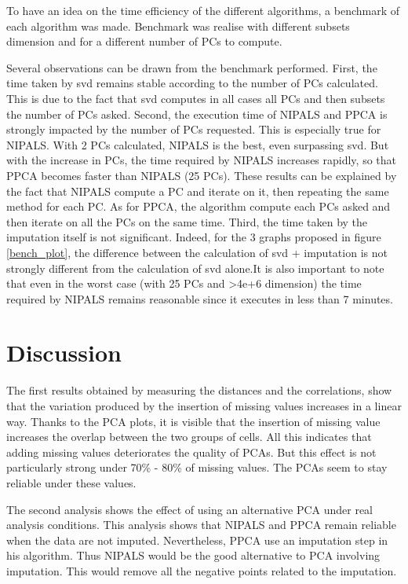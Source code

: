 \documentclass[a4paper, 11pt, twocolumn]{article}
\begin{document}
To have an idea on the time efficiency of the different algorithms, a benchmark of each algorithm was made. Benchmark was realise with different subsets dimension and for a different number of PCs to compute.

Several observations can be drawn from the benchmark performed.  First, the time taken by svd remains stable according to the number of PCs calculated. This is due to the fact that svd computes in all cases all PCs and then subsets the number of PCs asked. Second, the execution time of NIPALS and PPCA is strongly impacted by the number of PCs requested. This is especially true for NIPALS. With 2 PCs calculated, NIPALS is the best, even surpassing svd. But with the increase in PCs, the time required by NIPALS increases rapidly, so that PPCA becomes faster than NIPALS (25 PCs). These results can be explained by the fact that NIPALS compute a PC and iterate on it, then repeating the same method for each PC. As for PPCA, the algorithm compute each PCs asked and then iterate on all the PCs on the same time. 
Third, the time taken by the imputation itself is not significant. Indeed, for the 3 graphs proposed in figure \ref{bench_plot}, the difference between the calculation of svd + imputation is not strongly different from the calculation of svd alone.It is also important to note that even in the worst case (with 25 PCs and >4e+6 dimension) the time required by NIPALS remains reasonable since it executes in less than 7 minutes.


\section{Discussion}

The first results obtained by measuring the distances and the correlations, show that the variation produced by the insertion of missing values increases in a linear way. Thanks to the PCA plots, it is visible that the insertion of missing value increases the overlap between the two groups of cells. All this indicates that adding missing values deteriorates the quality of PCAs. But this effect is not particularly strong under 70\% - 80\% of missing values. The PCAs seem to stay reliable under these values.

The second analysis shows the effect of using an alternative PCA under real analysis conditions. This analysis shows that NIPALS and PPCA remain reliable when the data are not imputed. Nevertheless, PPCA use an imputation step in his algorithm. Thus NIPALS would be the good alternative to PCA involving imputation. This would remove all the negative points related to the imputation. 
\end{document}
